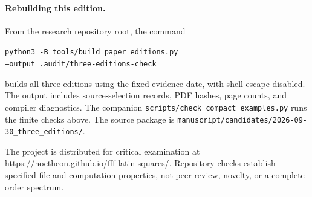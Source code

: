 \paragraph{Rebuilding this edition.}
From the research repository root, the command
\begin{center}\small
\texttt{python3 -B tools/build\_paper\_editions.py}\\
\texttt{--output .audit/three-editions-check}
\end{center}
builds all three editions using the fixed evidence date, with shell escape
disabled. The output includes source-selection records, PDF hashes, page
counts, and compiler diagnostics. The companion
\nolinkurl{scripts/check_compact_examples.py} runs the finite checks above.
The source package is
\nolinkurl{manuscript/candidates/2026-09-30_three_editions/}.

The project is distributed for critical examination at
\url{https://noetheon.github.io/fff-latin-squares/}.
Repository checks establish specified file and computation properties,
not peer review, novelty, or a complete order spectrum.
